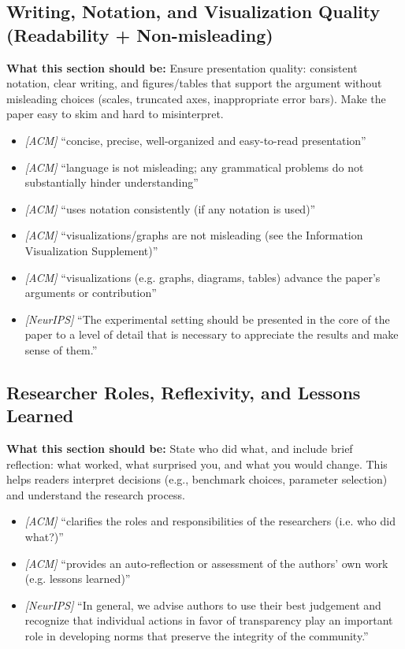 \documentclass[11pt]{article}
\begin{document}
\subsection{Writing, Notation, and Visualization Quality (Readability + Non-misleading)}
\noindent\textbf{What this section should be:}
Ensure presentation quality: consistent notation, clear writing, and figures/tables that support the argument without misleading choices (scales, truncated axes, inappropriate error bars). Make the paper easy to skim and hard to misinterpret.
\begin{itemize}
  \item \textit{[ACM]} ``concise, precise, well-organized and easy-to-read presentation''
  \item \textit{[ACM]} ``language is not misleading; any grammatical problems do not substantially hinder understanding''
  \item \textit{[ACM]} ``uses notation consistently (if any notation is used)''
  \item \textit{[ACM]} ``visualizations/graphs are not misleading (see the Information Visualization Supplement)''
  \item \textit{[ACM]} ``visualizations (e.g. graphs, diagrams, tables) advance the paper’s arguments or contribution''
  \item \textit{[NeurIPS]} ``The experimental setting should be presented in the core of the paper to a level of detail that is necessary to appreciate the results and make sense of them.''
\end{itemize}

\subsection{Researcher Roles, Reflexivity, and Lessons Learned}
\noindent\textbf{What this section should be:}
State who did what, and include brief reflection: what worked, what surprised you, and what you would change. This helps readers interpret decisions (e.g., benchmark choices, parameter selection) and understand the research process.
\begin{itemize}
  \item \textit{[ACM]} ``clarifies the roles and responsibilities of the researchers (i.e. who did what?)''
  \item \textit{[ACM]} ``provides an auto-reflection or assessment of the authors’ own work (e.g. lessons learned)''
  \item \textit{[NeurIPS]} ``In general, we advise authors to use their best judgement and recognize that individual actions in favor of transparency play an important role in developing norms that preserve the integrity of the community.''
\end{itemize}
\end{document}
